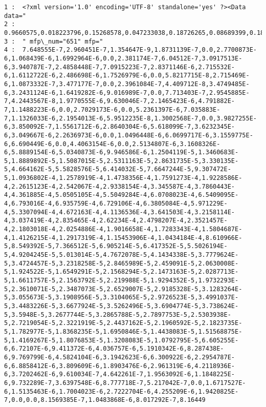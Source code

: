 \documentclass[11pt]{article}
\begin{document}
    \begin{Verbatim}[commandchars=\\\{\}]
1 :  <?xml version='1.0' encoding='UTF-8' standalone='yes' ?><Data data="
2 :  0.9660575,0.018223796,0.15268578,0.047233038,0.18726265,0.08689399,0.18726267,0.130341,14.059301,100000.0,-0.17917678,460.86,450.0,15.1302185,94.698715,1.97159,45.5222,52.50621,-27.28104,5.611103,6.8188424,-96.39908,-85.900154,14.377438,-9.968724,-23.636877,-29.150871,-210.49924,-116.667305,-122.93641,-45.450176,6.9457746,-6.304487,33.324524,20988.0,1968.75,350.0,1000.0,1.0,1.0,5
3 :  " mfp\_num="651" mfp="
4 :  7.648555E-7,2.960451E-7,1.354647E-9,1.8731139E-7,0.0,2.7700873E-6,1.068439E-6,1.6992964E-6,0.0,2.381174E-7,6.04512E-7,3.0917513E-6,3.940787E-7,2.4858448E-7,7.0915223E-7,2.8371146E-6,2.715532E-6,1.6112722E-6,2.486698E-6,1.7526979E-6,0.0,5.8217715E-8,2.715469E-6,1.0873332E-7,3.477177E-7,0.0,2.3961084E-7,4.409712E-8,3.4749485E-6,3.2431124E-6,1.6419282E-6,9.016989E-7,0.0,7.713403E-7,2.9545885E-7,4.2443567E-8,1.9770555E-6,9.630046E-7,2.1465423E-6,4.791882E-7,1.1488223E-6,0.0,2.7029173E-6,0.0,5.2361397E-6,7.035883E-7,1.1326033E-6,2.1954013E-6,5.9512235E-8,1.3002568E-7,0.0,3.9827255E-6,3.850092E-7,1.5561712E-6,2.8640304E-6,5.618099E-7,3.6232345E-6,3.049667E-6,2.2636973E-6,0.0,1.0496448E-6,6.0699717E-6,3.1559775E-6,6.690449E-6,0.0,4.4063154E-6,0.0,2.5134807E-6,3.1608326E-6,5.8889154E-6,5.0340873E-6,9.946586E-6,1.2504119E-5,1.3460683E-5,1.8889892E-5,1.5087015E-5,2.5311163E-5,2.8631735E-5,3.330135E-5,4.664162E-5,5.5828576E-5,6.414032E-5,7.6647244E-5,9.307472E-5,1.0936802E-4,1.2578919E-4,1.4738356E-4,1.7591273E-4,1.9228586E-4,2.2615123E-4,2.542067E-4,2.9338154E-4,3.345587E-4,3.7860443E-4,4.361885E-4,5.0505105E-4,5.5049284E-4,6.0708023E-4,6.5409095E-4,6.793016E-4,6.935759E-4,6.729106E-4,6.3805084E-4,5.971229E-4,5.3307094E-4,4.672163E-4,4.1136536E-4,3.641503E-4,3.2158114E-4,3.037419E-4,2.835465E-4,2.62234E-4,2.4798207E-4,2.3521457E-4,2.1803018E-4,2.0254886E-4,1.9016658E-4,1.7283343E-4,1.5804687E-4,1.4126215E-4,1.2917319E-4,1.15453906E-4,1.0434184E-4,8.610966E-5,8.549392E-5,7.366512E-5,6.905214E-5,6.417352E-5,5.5026194E-5,4.9204245E-5,5.013014E-5,4.7672078E-5,4.1434338E-5,3.7779624E-5,3.4724457E-5,3.2318258E-5,2.8465989E-5,2.459091E-5,2.0630008E-5,1.924522E-5,1.6549291E-5,2.1568294E-5,2.1473163E-5,2.0287713E-5,1.6611757E-5,2.1563792E-5,2.219988E-5,1.9294352E-5,1.9732293E-5,2.3610071E-5,2.3487073E-5,2.6529007E-5,2.9185328E-5,3.1283264E-5,3.055673E-5,3.1908956E-5,3.3104065E-5,2.9726523E-5,3.4991037E-5,3.4483226E-5,3.6677924E-5,3.5262496E-5,3.6904774E-5,3.738624E-5,3.5948E-5,3.2677744E-5,3.2865788E-5,2.7897753E-5,2.5303938E-5,2.7219054E-5,2.3221919E-5,2.4437162E-5,2.1960592E-5,2.1823735E-5,1.782977E-5,1.8368235E-5,1.6950846E-5,1.4438083E-5,1.51568875E-5,1.4169267E-5,1.8076853E-5,1.3208083E-5,1.0792795E-5,6.605255E-6,6.72107E-6,9.411372E-6,4.036757E-6,5.1910342E-6,8.287438E-6,9.769799E-6,4.5824104E-6,3.1942623E-6,6.300922E-6,2.2954787E-6,6.8858412E-6,3.809609E-6,1.8903476E-6,2.961319E-6,4.2118936E-6,3.7202462E-6,9.610034E-7,4.642261E-7,1.9563092E-6,1.1848225E-6,9.732289E-7,3.6397548E-6,8.777718E-7,5.217042E-7,0.0,1.6717527E-6,1.5135463E-6,1.7004023E-6,2.7222704E-6,4.255209E-6,1.9420825E-7,0.0,0.0,8.1569385E-7,1.0483868E-6,8.017292E-7,8.16449
\end{Verbatim}
\end{document}
